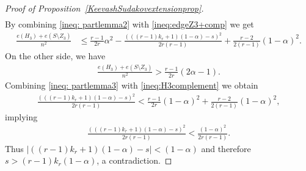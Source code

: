 \documentclass[11pt]{article}
\theoremstyle{definition}
\numberwithin{theo}{section}
\begin{document}
\begin{proof}[Proof of Proposition~\ref{KeevashSudakovextensionprop}]
\begin{align}
\end{align}
By combining \eqref{ineq: partlemma2} with  \eqref{ineq:edgeZ3+comp} we get
\begin{align}
\label{ineq:H3complement}
    \frac{e(H_3)+e(S\setminus Z_3)}{n^2} &\leq \frac{r-1}{2r}\alpha^2-\frac{(((r-1)k_r+1)(1-\alpha)-s)^2}{2r(r-1)}+\frac{r-2}{2(r-1)}(1-\alpha)^2.
\end{align}
On the other side, we have
\begin{align*}
    \frac{e(H_3)+e(S\setminus Z_3)}{n^2} > \frac{r-1}{2r}(2\alpha-1).
\end{align*}
Combining \eqref{ineq: partlemma3} with \eqref{ineq:H3complement} we obtain
\begin{align*}
\frac{(((r-1)k_r+1)(1-\alpha)-s)^2}{2r(r-1)} < \frac{r-1}{2r}(1-\alpha)^2+\frac{r-2}{2(r-1)}(1-\alpha)^2,
\end{align*}
implying
\begin{align*}
\frac{(((r-1)k_r+1)(1-\alpha)-s)^2}{2r(r-1)} < \frac{(1-\alpha)^2}{2r(r-1)}.
\end{align*}
Thus $\lvert ((r-1)k_r+1)(1-\alpha)-s \rvert < (1-\alpha)$ and therefore $s>(r-1)k_r(1-\alpha)$, a contradiction. 
\end{proof}
\end{document}
